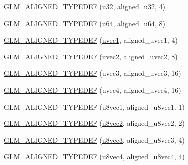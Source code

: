 \begin{DoxyCompactItemize}
\item 
\hyperlink{group__gtx__type__aligned_ga197570e03acbc3d18ab698e342971e8f}{G\+L\+M\+\_\+\+A\+L\+I\+G\+N\+E\+D\+\_\+\+T\+Y\+P\+E\+D\+E\+F} (\hyperlink{group__gtc__type__precision_ga54e837745059fd29017bed71cfa0a8db}{u32}, aligned\+\_\+u32, 4)
\item 
\hyperlink{group__gtx__type__aligned_ga0f033b21e145a1faa32c62ede5878993}{G\+L\+M\+\_\+\+A\+L\+I\+G\+N\+E\+D\+\_\+\+T\+Y\+P\+E\+D\+E\+F} (\hyperlink{group__gtc__type__precision_ga71cedd4972f9cb1a5e14dfe5ab83ecd7}{u64}, aligned\+\_\+u64, 8)
\item 
\hyperlink{group__gtx__type__aligned_ga509af83527f5cd512e9a7873590663aa}{G\+L\+M\+\_\+\+A\+L\+I\+G\+N\+E\+D\+\_\+\+T\+Y\+P\+E\+D\+E\+F} (\hyperlink{namespaceglm_a4e12bc23a3d060164eef452f81d92a03}{uvec1}, aligned\+\_\+uvec1, 4)
\item 
\hyperlink{group__gtx__type__aligned_ga94e86186978c502c6dc0c0d9c4a30679}{G\+L\+M\+\_\+\+A\+L\+I\+G\+N\+E\+D\+\_\+\+T\+Y\+P\+E\+D\+E\+F} (uvec2, aligned\+\_\+uvec2, 8)
\item 
\hyperlink{group__gtx__type__aligned_ga5cec574686a7f3c8ed24bb195c5e2d0a}{G\+L\+M\+\_\+\+A\+L\+I\+G\+N\+E\+D\+\_\+\+T\+Y\+P\+E\+D\+E\+F} (uvec3, aligned\+\_\+uvec3, 16)
\item 
\hyperlink{group__gtx__type__aligned_ga47edfdcee9c89b1ebdaf20450323b1d4}{G\+L\+M\+\_\+\+A\+L\+I\+G\+N\+E\+D\+\_\+\+T\+Y\+P\+E\+D\+E\+F} (uvec4, aligned\+\_\+uvec4, 16)
\item 
\hyperlink{group__gtx__type__aligned_ga5611d6718e3a00096918a64192e73a45}{G\+L\+M\+\_\+\+A\+L\+I\+G\+N\+E\+D\+\_\+\+T\+Y\+P\+E\+D\+E\+F} (\hyperlink{group__gtc__type__precision_ga024be724ff45865952190522b03fc0d5}{u8vec1}, aligned\+\_\+u8vec1, 1)
\item 
\hyperlink{group__gtx__type__aligned_ga19837e6f72b60d994a805ef564c6c326}{G\+L\+M\+\_\+\+A\+L\+I\+G\+N\+E\+D\+\_\+\+T\+Y\+P\+E\+D\+E\+F} (\hyperlink{group__gtc__type__precision_ga1c259b876f8757eb197b83a5fab476f0}{u8vec2}, aligned\+\_\+u8vec2, 2)
\item 
\hyperlink{group__gtx__type__aligned_ga9740cf8e34f068049b42a2753f9601c2}{G\+L\+M\+\_\+\+A\+L\+I\+G\+N\+E\+D\+\_\+\+T\+Y\+P\+E\+D\+E\+F} (\hyperlink{group__gtc__type__precision_ga8262aeb120701de1b57773eb10be0f35}{u8vec3}, aligned\+\_\+u8vec3, 4)
\item 
\hyperlink{group__gtx__type__aligned_ga8b8588bb221448f5541a858903822a57}{G\+L\+M\+\_\+\+A\+L\+I\+G\+N\+E\+D\+\_\+\+T\+Y\+P\+E\+D\+E\+F} (\hyperlink{group__gtc__type__precision_gaf3c840b8a90a194559121504ba599197}{u8vec4}, aligned\+\_\+u8vec4, 4)

\end{DoxyCompactItemize}
